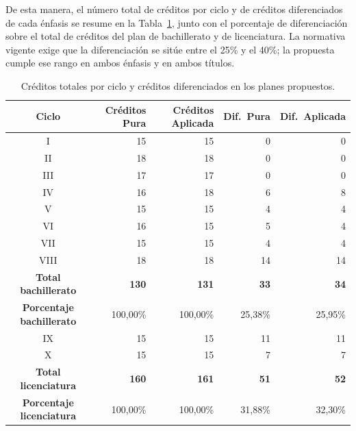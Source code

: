 \begin{refsection}
De esta manera, el número total de créditos por ciclo y de créditos diferenciados de cada énfasis se resume en la Tabla~\ref{tab:creditos-diferenciados-enfasis}, junto con el porcentaje de diferenciación sobre el total de créditos del plan de bachillerato y de licenciatura. La normativa vigente exige que la diferenciación se sitúe entre el 25\% y el 40\%; la propuesta cumple ese rango en ambos énfasis y en ambos títulos.

\begin{table}[H]
\centering

\small
\begin{tabular}{|c|r|r|r|r|}
\hline
\rowcolor[HTML]{00C0F3}
\textbf{Ciclo} & \textbf{Créditos Pura} & \textbf{Créditos Aplicada} & \textbf{Dif.\ Pura} & \textbf{Dif.\ Aplicada} \\
\hline
I & 15 & 15 & 0 & 0 \\
II & 18 & 18 & 0 & 0 \\
III & 17 & 17 & 0 & 0 \\
IV & 16 & 18 & 6 & 8 \\
V & 15 & 15 & 4 & 4 \\
VI & 16 & 15 & 5 & 4 \\
VII & 15 & 15 & 4 & 4 \\
VIII & 18 & 18 & 14 & 14 \\
\hline
\textbf{Total bachillerato} & \textbf{130} & \textbf{131} & \textbf{33} & \textbf{34} \\
\hline
\textbf{Porcentaje bachillerato} & 100{,}00\% & 100{,}00\% & 25{,}38\% & 25{,}95\% \\
\hline
IX & 15 & 15 & 11 & 11 \\
X & 15 & 15 & 7 & 7 \\
\hline
\textbf{Total licenciatura} & \textbf{160} & \textbf{161} & \textbf{51} & \textbf{52} \\
\hline
\textbf{Porcentaje licenciatura} & 100{,}00\% & 100{,}00\% & 31{,}88\% & 32{,}30\% \\
\hline
\end{tabular}
\caption{Créditos totales por ciclo y créditos diferenciados en los planes propuestos.}
\label{tab:creditos-diferenciados-enfasis}

\end{table}


\printbibliography[heading=subbibliography,section=\the\value{refsection}]
\end{refsection}
